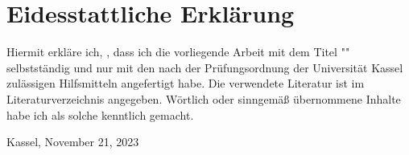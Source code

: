 \chapter*{Eidesstattliche Erklärung}


Hiermit erkläre ich, \thesisauthorname, dass ich die vorliegende Arbeit mit dem Titel "\thesistitle" selbstständig 
und nur mit den nach der Prüfungsordnung der Universität Kassel zulässigen Hilfsmitteln angefertigt habe.
Die verwendete Literatur ist im Literaturverzeichnis angegeben.
Wörtlich oder sinngemäß übernommene Inhalte habe ich als solche kenntlich gemacht.

\vspace{1cm}

Kassel, November 21, 2023

\begin{flushright}
  \underline{\hspace{7cm}} \\
  \thesisauthorname
\end{flushright}
